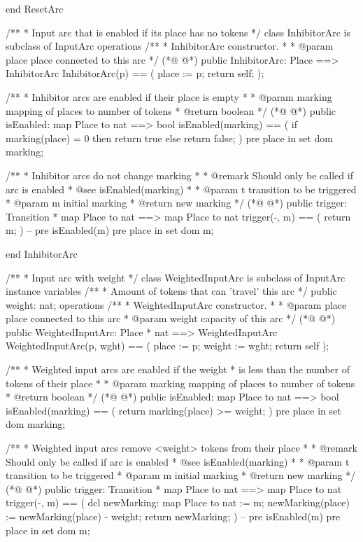 \begin{vdmpp}
end ResetArc

/**
 * Input arc that is enabled if its place has no tokens
 */
class InhibitorArc is subclass of InputArc
  operations
    /**
     * InhibitorArc constructor.
     *
     * @param place place connected to this arc
     */
(*@
\label{InhibitorArc:100}
@*)
    public InhibitorArc: Place ==> InhibitorArc
    InhibitorArc(p) == (
      place := p;
      return self;
    );

    /**
     * Inhibitor arcs are enabled if their place is empty
     *
     * @param marking mapping of places to number of tokens
     * @return boolean
     */
(*@
\label{isEnabled:112}
@*)
    public isEnabled: map Place to nat ==> bool
    isEnabled(marking) == (
      if marking(place) = 0 then
        return true
      else
        return false;
    )
    pre place in set dom marking;

    /**
     * Inhibitor arcs do not change marking
     *
     * @remark Should only be called if arc is enabled
     * @see isEnabled(marking)
     *
     * @param t transition to be triggered
     * @param m initial marking
     * @return new marking
     */
(*@
\label{trigger:130}
@*)
    public trigger: Transition * map Place to nat ==> map Place to nat
    trigger(-, m) == (
      return m;
    )
    -- pre isEnabled(m)
    pre place in set dom m;

end InhibitorArc

/**
 * Input arc with weight
 */
class WeightedInputArc is subclass of InputArc
  instance variables
    /**
     * Amount of tokens that can 'travel' this arc
     */
    public weight: nat;
  operations
    /**
     * WeightedInputArc constructor.
     *
     * @param place place connected to this arc
     * @param weight capacity of this arc
     */
(*@
\label{WeightedInputArc:154}
@*)
    public WeightedInputArc: Place * nat ==> WeightedInputArc
    WeightedInputArc(p, wght) == (
      place := p;
      weight := wght;
      return self
    );

    /**
     * Weighted input arcs are enabled if the weight
     * is less than the number of tokens of their place
     *
     * @param marking mapping of places to number of tokens
     * @return boolean
     */
(*@
\label{isEnabled:168}
@*)
    public isEnabled: map Place to nat ==> bool
    isEnabled(marking) == (
      return marking(place) >= weight;
    )
    pre place in set dom marking;

    /**
     * Weighted input arcs remove <weight> tokens from their place
     *
     * @remark Should only be called if arc is enabled
     * @see isEnabled(marking)
     *
     * @param t transition to be triggered
     * @param m initial marking
     * @return new marking
     */
(*@
\label{trigger:183}
@*)
    public trigger: Transition * map Place to nat ==> map Place to nat
    trigger(-, m) == (
      dcl newMarking: map Place to nat := m;
      newMarking(place) := newMarking(place) - weight;
      return newMarking;
    )
    -- pre isEnabled(m)
    pre place in set dom m;


\end{vdmpp}

